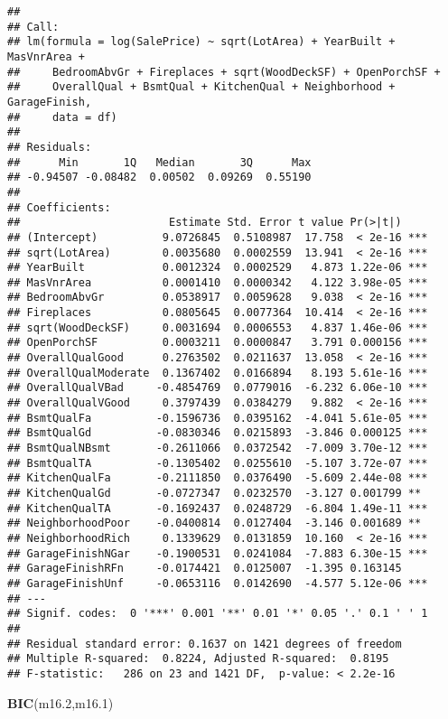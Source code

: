 \documentclass[
]{article}
\newenvironment{Shaded}{\begin{snugshade}}{\end{snugshade}}
\newcommand{\FloatTok}[1]{\textcolor[rgb]{0.00,0.00,0.81}{#1}}
\newcommand{\FunctionTok}[1]{\textcolor[rgb]{0.13,0.29,0.53}{\textbf{#1}}}
\newcommand{\NormalTok}[1]{#1}
\begin{document}
\begin{verbatim}
## 
## Call:
## lm(formula = log(SalePrice) ~ sqrt(LotArea) + YearBuilt + MasVnrArea + 
##     BedroomAbvGr + Fireplaces + sqrt(WoodDeckSF) + OpenPorchSF + 
##     OverallQual + BsmtQual + KitchenQual + Neighborhood + GarageFinish, 
##     data = df)
## 
## Residuals:
##      Min       1Q   Median       3Q      Max 
## -0.94507 -0.08482  0.00502  0.09269  0.55190 
## 
## Coefficients:
##                       Estimate Std. Error t value Pr(>|t|)    
## (Intercept)          9.0726845  0.5108987  17.758  < 2e-16 ***
## sqrt(LotArea)        0.0035680  0.0002559  13.941  < 2e-16 ***
## YearBuilt            0.0012324  0.0002529   4.873 1.22e-06 ***
## MasVnrArea           0.0001410  0.0000342   4.122 3.98e-05 ***
## BedroomAbvGr         0.0538917  0.0059628   9.038  < 2e-16 ***
## Fireplaces           0.0805645  0.0077364  10.414  < 2e-16 ***
## sqrt(WoodDeckSF)     0.0031694  0.0006553   4.837 1.46e-06 ***
## OpenPorchSF          0.0003211  0.0000847   3.791 0.000156 ***
## OverallQualGood      0.2763502  0.0211637  13.058  < 2e-16 ***
## OverallQualModerate  0.1367402  0.0166894   8.193 5.61e-16 ***
## OverallQualVBad     -0.4854769  0.0779016  -6.232 6.06e-10 ***
## OverallQualVGood     0.3797439  0.0384279   9.882  < 2e-16 ***
## BsmtQualFa          -0.1596736  0.0395162  -4.041 5.61e-05 ***
## BsmtQualGd          -0.0830346  0.0215893  -3.846 0.000125 ***
## BsmtQualNBsmt       -0.2611066  0.0372542  -7.009 3.70e-12 ***
## BsmtQualTA          -0.1305402  0.0255610  -5.107 3.72e-07 ***
## KitchenQualFa       -0.2111850  0.0376490  -5.609 2.44e-08 ***
## KitchenQualGd       -0.0727347  0.0232570  -3.127 0.001799 ** 
## KitchenQualTA       -0.1692437  0.0248729  -6.804 1.49e-11 ***
## NeighborhoodPoor    -0.0400814  0.0127404  -3.146 0.001689 ** 
## NeighborhoodRich     0.1339629  0.0131859  10.160  < 2e-16 ***
## GarageFinishNGar    -0.1900531  0.0241084  -7.883 6.30e-15 ***
## GarageFinishRFn     -0.0174421  0.0125007  -1.395 0.163145    
## GarageFinishUnf     -0.0653116  0.0142690  -4.577 5.12e-06 ***
## ---
## Signif. codes:  0 '***' 0.001 '**' 0.01 '*' 0.05 '.' 0.1 ' ' 1
## 
## Residual standard error: 0.1637 on 1421 degrees of freedom
## Multiple R-squared:  0.8224, Adjusted R-squared:  0.8195 
## F-statistic:   286 on 23 and 1421 DF,  p-value: < 2.2e-16
\end{verbatim}

\begin{Shaded}
\begin{Highlighting}[]
\FunctionTok{BIC}\NormalTok{(m16}\FloatTok{.2}\NormalTok{,m16}\FloatTok{.1}\NormalTok{)}
\end{Highlighting}
\end{Shaded}
\end{document}

